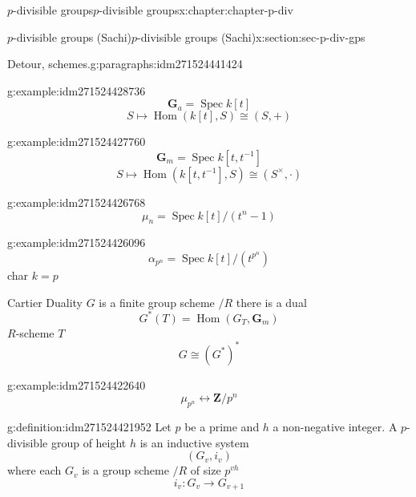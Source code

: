 \documentclass[oneside,10pt,]{book}
\numberwithin{equation}{section}
\newcommand{\inv}{^{-1}}
\newcommand{\ZZ}{\mathbf{Z}}
\DeclareMathOperator{\Hom}{Hom}
\DeclareMathOperator{\Spec}{Spec}
\begin{document}
\begin{chapterptx}{\(p\)-divisible groups}{}{\(p\)-divisible groups}{}{}{x:chapter:chapter-p-div}
\begin{sectionptx}{\(p\)-divisible groups (Sachi)}{}{\(p\)-divisible groups (Sachi)}{}{}{x:section:sec-p-div-gps}
\begin{paragraphs}{Detour, schemes.}{g:paragraphs:idm271524441424}
\begin{example}{}{g:example:idm271524428736}
%
\begin{equation*}
\mathbf G_a = \Spec k[t]
\end{equation*}
%
\begin{equation*}
S\mapsto \Hom(k[t], S) \cong (S,+)
\end{equation*}
%
\end{example}
\begin{example}{}{g:example:idm271524427760}%
%
\begin{equation*}
\mathbf G_m = \Spec k[t,t\inv]
\end{equation*}
%
\begin{equation*}
S\mapsto \Hom(k[t,t\inv], S) \cong (S^\times,\cdot)
\end{equation*}
%
\end{example}
\begin{example}{}{g:example:idm271524426768}%
%
\begin{equation*}
\mu_n = \Spec k[t]/(t^n -1)
\end{equation*}
%
\end{example}
\begin{example}{}{g:example:idm271524426096}%
%
\begin{equation*}
\alpha_{p^n} = \Spec k[t]/(t^{p^n})
\end{equation*}
char \(k = p\)%
\end{example}
Cartier Duality \(G\) is a finite group scheme \(/R\) there is a dual%
\begin{equation*}
G^* (T) = \Hom (G_T, \mathbf G_m)
\end{equation*}
\(R\)-scheme \(T\)%
\begin{equation*}
G \cong (G^*)^*
\end{equation*}
%
\begin{example}{}{g:example:idm271524422640}%
%
\begin{equation*}
\mu_{p^n} \leftrightarrow \ZZ/p^n
\end{equation*}
%
\end{example}
\begin{definition}{}{g:definition:idm271524421952}%
Let \(p\) be a prime and \(h\) a non-negative integer. A \(p\)-divisible group of height \(h\) is an inductive system%
\begin{equation*}
(G_v, i_v)
\end{equation*}
where each \(G_v\) is a group scheme \(/R\) of size \(p^{vh}\)%
\begin{equation*}
i_v \colon G_v \to G_{v+1}
\end{equation*}

\end{definition}
\end{paragraphs}
\end{sectionptx}
\end{chapterptx}
\end{document}
